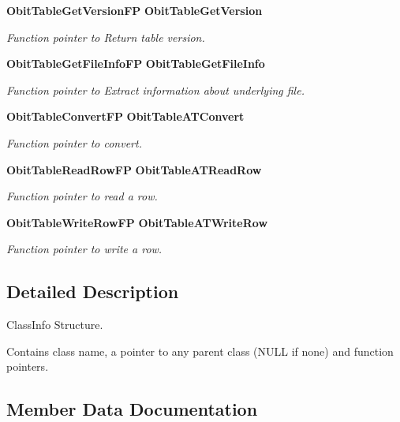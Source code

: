 \begin{CompactItemize}
{\bf Obit\-Table\-Get\-Version\-FP} {\bf Obit\-Table\-Get\-Version}
\begin{CompactList}\small\item\em Function pointer to Return table version. \item\end{CompactList}\item 
{\bf Obit\-Table\-Get\-File\-Info\-FP} {\bf Obit\-Table\-Get\-File\-Info}
\begin{CompactList}\small\item\em Function pointer to Extract information about underlying file. \item\end{CompactList}\item 
{\bf Obit\-Table\-Convert\-FP} {\bf Obit\-Table\-ATConvert}
\begin{CompactList}\small\item\em Function pointer to convert. \item\end{CompactList}\item 
{\bf Obit\-Table\-Read\-Row\-FP} {\bf Obit\-Table\-ATRead\-Row}
\begin{CompactList}\small\item\em Function pointer to read a row. \item\end{CompactList}\item 
{\bf Obit\-Table\-Write\-Row\-FP} {\bf Obit\-Table\-ATWrite\-Row}
\begin{CompactList}\small\item\em Function pointer to write a row. \item\end{CompactList}\end{CompactItemize}


\subsection{Detailed Description}
Class\-Info Structure. 

Contains class name, a pointer to any parent class (NULL if none) and function pointers. 



\subsection{Member Data Documentation}
